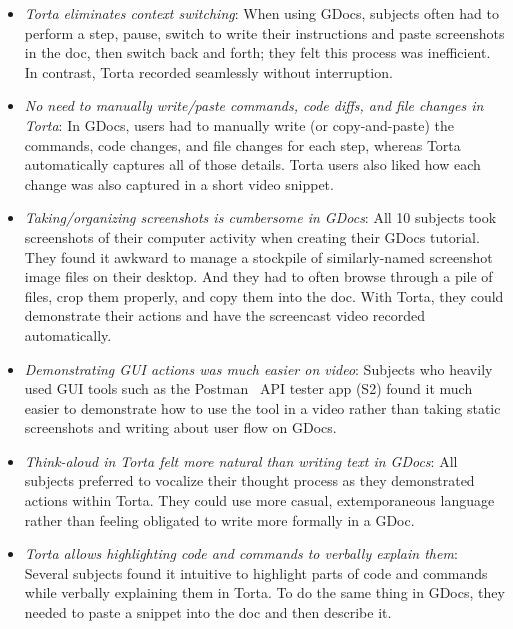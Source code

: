 \begin{itemize}\itemsep0pt

\item \emph{Torta eliminates context switching}: When using GDocs,
subjects often had to perform a step, pause, switch to write their
instructions and paste screenshots in the doc, then switch back and
forth; they felt this process was inefficient. In contrast, Torta
recorded seamlessly without interruption.

\item \emph{No need to manually write/paste commands, code diffs, and
file changes in Torta}: In GDocs, users had to manually write (or
copy-and-paste) the commands, code changes, and file changes for each
step, whereas Torta automatically captures all of those details.
%
Torta users also liked how each change was also captured in a short
video snippet.

\item \emph{Taking/organizing screenshots is cumbersome in GDocs}:
All 10 subjects took screenshots of their computer activity when
creating their GDocs tutorial. They found it awkward to manage a
stockpile of similarly-named screenshot image files on their desktop.
And they had to often browse through a pile of files, crop them
properly, and copy them into the doc. With Torta, they could demonstrate
their actions and have the screencast video recorded automatically.

\item \emph{Demonstrating GUI actions was much easier on video}:
Subjects who heavily used GUI tools such as the Postman~\cite{postman}
API tester app (S2) found it much easier to demonstrate how to use the
tool in a video rather than taking static screenshots and writing about
user flow on GDocs.

\item \emph{Think-aloud in Torta felt more natural than writing text in
GDocs}: All subjects preferred to vocalize their thought process as they
demonstrated actions within Torta. They could use more casual,
extemporaneous language rather than feeling obligated to write more
formally in a GDoc.

\item \emph{Torta allows highlighting code and commands to verbally
explain them}: Several subjects found it intuitive to highlight parts of
code and commands while verbally explaining them in Torta. To do the
same thing in GDocs, they needed to paste a snippet into the doc and
then describe it.


\end{itemize}

